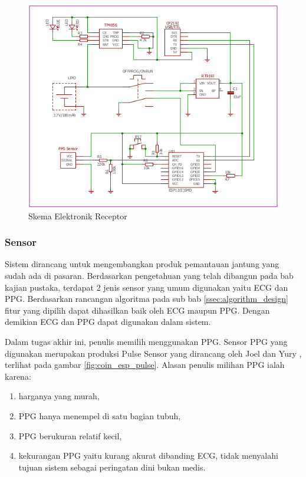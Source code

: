 \begin{figure}[H]
\centering
\includegraphics[scale=0.7]{images/schematics.png}
\caption{Skema Elektronik Receptor}
\label{fig:schematics}
\end{figure}

\subsubsection{Sensor}
Sistem dirancang untuk mengembangkan produk pemantauan jantung yang sudah ada di pasaran. Berdasarkan pengetahuan yang telah dibangun pada bab kajian pustaka, terdapat 2 jenis sensor yang umum digunakan yaitu ECG dan PPG. Berdasarkan rancangan algoritma pada sub bab \ref{ssec:algorithm_design} fitur yang dipilih dapat dihasilkan baik oleh ECG maupun PPG. Dengan demikian ECG dan PPG dapat digunakan dalam sistem.

Dalam tugas akhir ini, penulis memilih menggunakan PPG. Sensor PPG yang digunakan merupakan produksi Pulse Sensor yang dirancang oleh Joel dan Yury \cite{pulse_sensor}, terlihat pada gambar \ref{fig:coin_esp_pulse}. Alasan penulis milihan PPG ialah karena:
\begin{enumerate}
	\item harganya yang murah,
	\item PPG hanya menempel di satu bagian tubuh,
	\item PPG berukuran relatif kecil,
	\item kekurangan PPG yaitu kurang akurat dibanding ECG, tidak menyalahi tujuan sistem sebagai peringatan dini bukan medis.
\end{enumerate}

